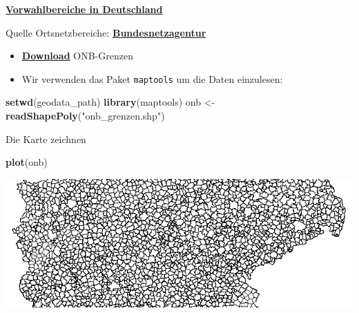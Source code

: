 \documentclass[ignorenonframetext,]{beamer}
\newenvironment{Shaded}{\begin{snugshade}}{\end{snugshade}}
\newcommand{\KeywordTok}[1]{\textcolor[rgb]{0.13,0.29,0.53}{\textbf{#1}}}
\newcommand{\NormalTok}[1]{#1}
\newcommand{\StringTok}[1]{\textcolor[rgb]{0.31,0.60,0.02}{#1}}
\begin{document}
\begin{frame}[fragile]{\href{http://www.bundesnetzagentur.de/SharedDocs/Downloads/DE/Sachgebiete/Telekommunikation/Unternehmen_Institutionen/Nummerierung/Rufnummern/ONVerzeichnisse/ONBGrenzen/ONB_Grenzen.html}{\textbf{Vorwahlbereiche
in Deutschland}}}
\protect\hypertarget{vorwahlbereiche-in-deutschland}{}

\begin{block}{Quelle Ortsnetzbereiche:
\href{https://www.bundesnetzagentur.de/DE/Sachgebiete/Telekommunikation/Unternehmen_Institutionen/Nummerierung/Rufnummern/ONRufnr/ON_Einteilung_ONB/ON_ONB_ONKz_ONBGrenzen_Basepage.html}{\textbf{Bundesnetzagentur}}}

\begin{itemize}
\item
  \href{https://www.bundesnetzagentur.de/SharedDocs/Downloads/DE/Sachgebiete/Telekommunikation/Unternehmen_Institutionen/Nummerierung/Rufnummern/ONVerzeichnisse/ONBGrenzen/ONB-Grenzen-2018.zip?__blob=publicationFile\&v=21}{\textbf{Download}}
  ONB-Grenzen
\item
  Wir verwenden das Paket \texttt{maptools} um die Daten einzulesen:
\end{itemize}

\begin{Shaded}
\begin{Highlighting}[]
\KeywordTok{setwd}\NormalTok{(geodata_path)}
\KeywordTok{library}\NormalTok{(maptools)}
\NormalTok{onb <-}\StringTok{ }\KeywordTok{readShapePoly}\NormalTok{(}\StringTok{"onb_grenzen.shp"}\NormalTok{)}
\end{Highlighting}
\end{Shaded}

\end{block}

\end{frame}

\begin{frame}[fragile]{Die Karte zeichnen}
\protect\hypertarget{die-karte-zeichnen}{}

\begin{Shaded}
\begin{Highlighting}[]
\KeywordTok{plot}\NormalTok{(onb)}
\end{Highlighting}
\end{Shaded}

\includegraphics{figure/ONB_bereiche.PNG}

\end{frame}
\end{document}
